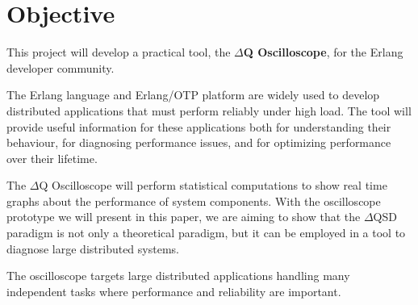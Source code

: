 \section{Objective}
         This project will develop a practical tool, the \textbf{$\Delta$Q Oscilloscope}, for the Erlang developer community. 
    
    The Erlang language and Erlang/OTP platform are widely used to develop distributed applications that must perform reliably under high load. The tool will provide useful information for these applications both for understanding their behaviour, for diagnosing performance issues, and for optimizing performance over their lifetime. 

    The $\Delta$Q Oscilloscope will perform statistical computations to show real time graphs about the performance of system components. With the oscilloscope prototype we will present in this paper, we are aiming to show that the $\Delta$QSD paradigm is not only a theoretical paradigm, but it can be employed in a tool to diagnose large distributed systems.  
 
    The oscilloscope targets large distributed applications handling many independent tasks where performance and reliability are important. 
    

